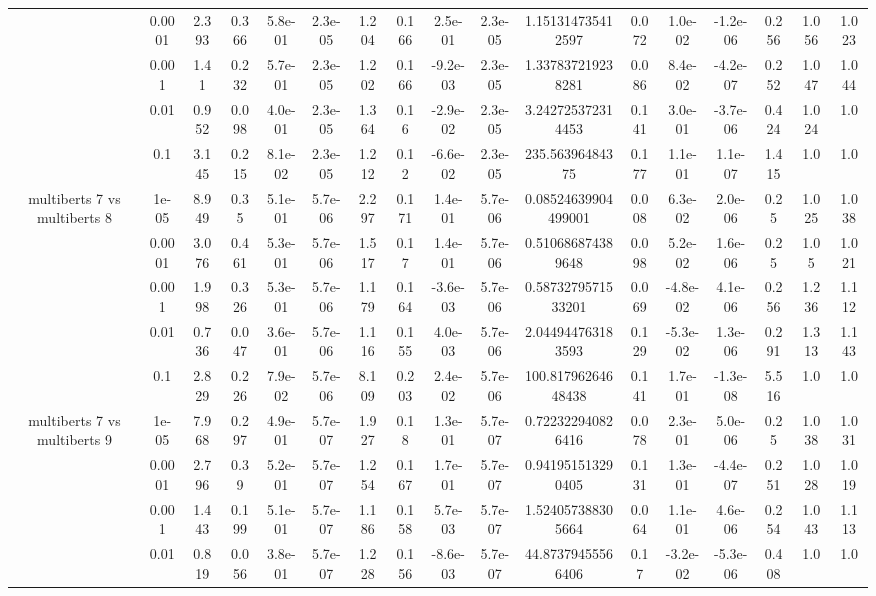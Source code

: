 \begin{tabular}{|c|c|c|c|c|c|c|c|c|c|c|c|c|c|c|c|c|}
 & 0.0001 & 2.393 & 0.366 & 5.8e-01 & 2.3e-05 & 1.204 & 0.166 & 2.5e-01 & 2.3e-05 & 1.151314735412597 & 0.072 & 1.0e-02 & -1.2e-06 & 0.256 & 1.056 & 1.023 \\
 & 0.001 & 1.41 & 0.232 & 5.7e-01 & 2.3e-05 & 1.202 & 0.166 & -9.2e-03 & 2.3e-05 & 1.337837219238281 & 0.086 & 8.4e-02 & -4.2e-07 & 0.252 & 1.047 & 1.044 \\
 & 0.01 & 0.952 & 0.098 & 4.0e-01 & 2.3e-05 & 1.364 & 0.16 & -2.9e-02 & 2.3e-05 & 3.242725372314453 & 0.141 & 3.0e-01 & -3.7e-06 & 0.424 & 1.024 & 1.0 \\
 & 0.1 & 3.145 & 0.215 & 8.1e-02 & 2.3e-05 & 1.212 & 0.12 & -6.6e-02 & 2.3e-05 & 235.56396484375 & 0.177 & 1.1e-01 & 1.1e-07 & 1.415 & 1.0 & 1.0 \\
\hline
\multirow{5}{*}{multiberts 7 vs multiberts 8} & 1e-05 & 8.949 & 0.35 & 5.1e-01 & 5.7e-06 & 2.297 & 0.171 & 1.4e-01 & 5.7e-06 & 0.08524639904499001 & 0.008 & 6.3e-02 & 2.0e-06 & 0.25 & 1.025 & 1.038 \\
 & 0.0001 & 3.076 & 0.461 & 5.3e-01 & 5.7e-06 & 1.517 & 0.17 & 1.4e-01 & 5.7e-06 & 0.510686874389648 & 0.098 & 5.2e-02 & 1.6e-06 & 0.25 & 1.05 & 1.021 \\
 & 0.001 & 1.998 & 0.326 & 5.3e-01 & 5.7e-06 & 1.179 & 0.164 & -3.6e-03 & 5.7e-06 & 0.5873279571533201 & 0.069 & -4.8e-02 & 4.1e-06 & 0.256 & 1.236 & 1.112 \\
 & 0.01 & 0.736 & 0.047 & 3.6e-01 & 5.7e-06 & 1.116 & 0.155 & 4.0e-03 & 5.7e-06 & 2.044944763183593 & 0.129 & -5.3e-02 & 1.3e-06 & 0.291 & 1.313 & 1.143 \\
 & 0.1 & 2.829 & 0.226 & 7.9e-02 & 5.7e-06 & 8.109 & 0.203 & 2.4e-02 & 5.7e-06 & 100.81796264648438 & 0.141 & 1.7e-01 & -1.3e-08 & 5.516 & 1.0 & 1.0 \\
\hline
\multirow{5}{*}{multiberts 7 vs multiberts 9} & 1e-05 & 7.968 & 0.297 & 4.9e-01 & 5.7e-07 & 1.927 & 0.18 & 1.3e-01 & 5.7e-07 & 0.722322940826416 & 0.078 & 2.3e-01 & 5.0e-06 & 0.25 & 1.038 & 1.031 \\
 & 0.0001 & 2.796 & 0.39 & 5.2e-01 & 5.7e-07 & 1.254 & 0.167 & 1.7e-01 & 5.7e-07 & 0.941951513290405 & 0.131 & 1.3e-01 & -4.4e-07 & 0.251 & 1.028 & 1.019 \\
 & 0.001 & 1.443 & 0.199 & 5.1e-01 & 5.7e-07 & 1.186 & 0.158 & 5.7e-03 & 5.7e-07 & 1.524057388305664 & 0.064 & 1.1e-01 & 4.6e-06 & 0.254 & 1.043 & 1.113 \\
 & 0.01 & 0.819 & 0.056 & 3.8e-01 & 5.7e-07 & 1.228 & 0.156 & -8.6e-03 & 5.7e-07 & 44.87379455566406 & 0.17 & -3.2e-02 & -5.3e-06 & 0.408 & 1.0 & 1.0 \\

\end{tabular}
